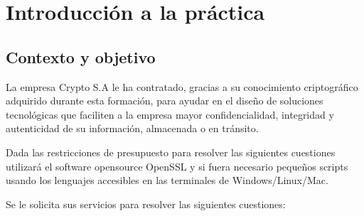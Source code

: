 \chapter{Introducción a la práctica}
\label{sec:introduccion}

\section{Contexto y objetivo}
La empresa Crypto S.A le ha contratado, gracias a su conocimiento criptográfico adquirido
durante esta formación, para ayudar en el diseño de soluciones tecnológicas que faciliten a
la empresa mayor confidencialidad, integridad y autenticidad de su información, almacenada o en tránsito.

Dada las restricciones de presupuesto para resolver las siguientes cuestiones utilizará el
software opensource OpenSSL y si fuera necesario pequeños scripts usando los lenguajes
accesibles en las terminales de Windows/Linux/Mac.

Se le solicita sus servicios para resolver las siguientes cuestiones:
